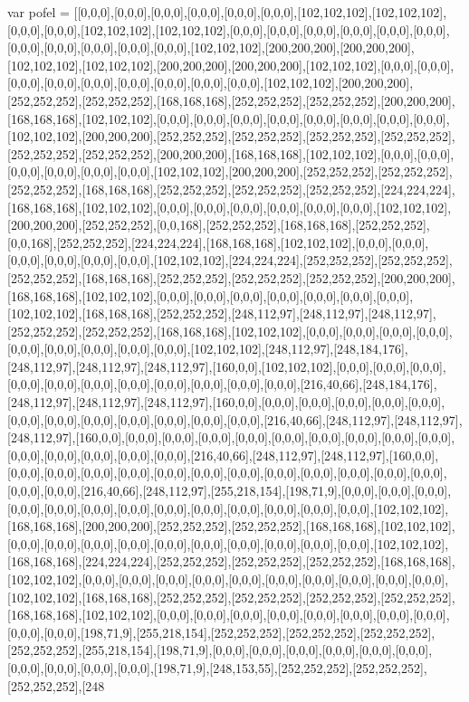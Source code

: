 var pofel = [[0,0,0],[0,0,0],[0,0,0],[0,0,0],[0,0,0],[0,0,0],[102,102,102],[102,102,102],[0,0,0],[0,0,0],[102,102,102],[102,102,102],[0,0,0],[0,0,0],[0,0,0],[0,0,0],[0,0,0],[0,0,0],[0,0,0],[0,0,0],[0,0,0],[0,0,0],[0,0,0],[102,102,102],[200,200,200],[200,200,200],[102,102,102],[102,102,102],[200,200,200],[200,200,200],[102,102,102],[0,0,0],[0,0,0],[0,0,0],[0,0,0],[0,0,0],[0,0,0],[0,0,0],[0,0,0],[0,0,0],[102,102,102],[200,200,200],[252,252,252],[252,252,252],[168,168,168],[252,252,252],[252,252,252],[200,200,200],[168,168,168],[102,102,102],[0,0,0],[0,0,0],[0,0,0],[0,0,0],[0,0,0],[0,0,0],[0,0,0],[0,0,0],[102,102,102],[200,200,200],[252,252,252],[252,252,252],[252,252,252],[252,252,252],[252,252,252],[252,252,252],[200,200,200],[168,168,168],[102,102,102],[0,0,0],[0,0,0],[0,0,0],[0,0,0],[0,0,0],[0,0,0],[102,102,102],[200,200,200],[252,252,252],[252,252,252],[252,252,252],[168,168,168],[252,252,252],[252,252,252],[252,252,252],[224,224,224],[168,168,168],[102,102,102],[0,0,0],[0,0,0],[0,0,0],[0,0,0],[0,0,0],[0,0,0],[102,102,102],[200,200,200],[252,252,252],[0,0,168],[252,252,252],[168,168,168],[252,252,252],[0,0,168],[252,252,252],[224,224,224],[168,168,168],[102,102,102],[0,0,0],[0,0,0],[0,0,0],[0,0,0],[0,0,0],[0,0,0],[102,102,102],[224,224,224],[252,252,252],[252,252,252],[252,252,252],[168,168,168],[252,252,252],[252,252,252],[252,252,252],[200,200,200],[168,168,168],[102,102,102],[0,0,0],[0,0,0],[0,0,0],[0,0,0],[0,0,0],[0,0,0],[0,0,0],[102,102,102],[168,168,168],[252,252,252],[248,112,97],[248,112,97],[248,112,97],[252,252,252],[252,252,252],[168,168,168],[102,102,102],[0,0,0],[0,0,0],[0,0,0],[0,0,0],[0,0,0],[0,0,0],[0,0,0],[0,0,0],[0,0,0],[102,102,102],[248,112,97],[248,184,176],[248,112,97],[248,112,97],[248,112,97],[160,0,0],[102,102,102],[0,0,0],[0,0,0],[0,0,0],[0,0,0],[0,0,0],[0,0,0],[0,0,0],[0,0,0],[0,0,0],[0,0,0],[0,0,0],[216,40,66],[248,184,176],[248,112,97],[248,112,97],[248,112,97],[160,0,0],[0,0,0],[0,0,0],[0,0,0],[0,0,0],[0,0,0],[0,0,0],[0,0,0],[0,0,0],[0,0,0],[0,0,0],[0,0,0],[0,0,0],[216,40,66],[248,112,97],[248,112,97],[248,112,97],[160,0,0],[0,0,0],[0,0,0],[0,0,0],[0,0,0],[0,0,0],[0,0,0],[0,0,0],[0,0,0],[0,0,0],[0,0,0],[0,0,0],[0,0,0],[0,0,0],[0,0,0],[216,40,66],[248,112,97],[248,112,97],[160,0,0],[0,0,0],[0,0,0],[0,0,0],[0,0,0],[0,0,0],[0,0,0],[0,0,0],[0,0,0],[0,0,0],[0,0,0],[0,0,0],[0,0,0],[0,0,0],[0,0,0],[216,40,66],[248,112,97],[255,218,154],[198,71,9],[0,0,0],[0,0,0],[0,0,0],[0,0,0],[0,0,0],[0,0,0],[0,0,0],[0,0,0],[0,0,0],[0,0,0],[0,0,0],[0,0,0],[0,0,0],[102,102,102],[168,168,168],[200,200,200],[252,252,252],[252,252,252],[168,168,168],[102,102,102],[0,0,0],[0,0,0],[0,0,0],[0,0,0],[0,0,0],[0,0,0],[0,0,0],[0,0,0],[0,0,0],[0,0,0],[102,102,102],[168,168,168],[224,224,224],[252,252,252],[252,252,252],[252,252,252],[168,168,168],[102,102,102],[0,0,0],[0,0,0],[0,0,0],[0,0,0],[0,0,0],[0,0,0],[0,0,0],[0,0,0],[0,0,0],[0,0,0],[102,102,102],[168,168,168],[252,252,252],[252,252,252],[252,252,252],[252,252,252],[168,168,168],[102,102,102],[0,0,0],[0,0,0],[0,0,0],[0,0,0],[0,0,0],[0,0,0],[0,0,0],[0,0,0],[0,0,0],[0,0,0],[198,71,9],[255,218,154],[252,252,252],[252,252,252],[252,252,252],[252,252,252],[255,218,154],[198,71,9],[0,0,0],[0,0,0],[0,0,0],[0,0,0],[0,0,0],[0,0,0],[0,0,0],[0,0,0],[0,0,0],[0,0,0],[198,71,9],[248,153,55],[252,252,252],[252,252,252],[252,252,252],[248
